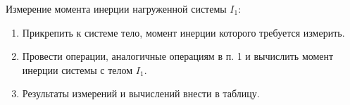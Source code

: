 \item Измерение момента инерции нагруженной системы $I_1$:
    \begin{enumerate}
        \item Прикрепить к системе тело, момент инерции которого требуется измерить.
        \item Провести операции, аналогичные операциям в п. 1 и вычислить момент инерции системы с телом $I_1$.
        \item Результаты измерений и вычислений внести в таблицу.
    \end{enumerate}